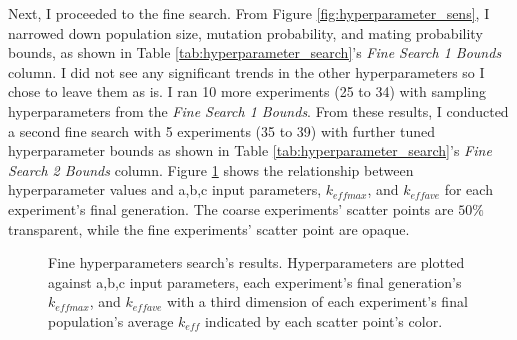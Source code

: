Next, I proceeded to the fine search. 
From Figure \ref{fig:hyperparameter_sens}, I narrowed down population size, 
mutation probability, and mating probability bounds, as shown in Table 
\ref{tab:hyperparameter_search}'s \textit{Fine Search 1 Bounds} column. 
I did not see any significant trends in the other hyperparameters so I chose 
to leave them as is. 
I ran 10 more experiments (25 to 34) with sampling hyperparameters from 
the \textit{Fine Search 1 Bounds}. 
From these results, I conducted a second fine search with 5 experiments 
(35 to 39) with further tuned hyperparameter bounds as shown in Table 
\ref{tab:hyperparameter_search}'s \textit{Fine Search 2 Bounds} column. 
Figure \ref{fig:input_hyperparameters_sens} shows the relationship between 
hyperparameter values and a,b,c input parameters, $k_{eff max}$, and 
$k_{eff ave}$ for each experiment's final generation. 
The coarse experiments' scatter points are $50\%$ transparent, while the fine 
experiments' scatter point are opaque. 
\begin{figure}[]
    \centering
    \caption{Fine hyperparameters search's results. Hyperparameters are plotted 
    against a,b,c input parameters, each experiment's final generation's 
    $k_{eff max}$, and $k_{eff ave}$ with a third dimension of each experiment's 
    final population's average $k_{eff}$ indicated by each scatter point's color.}
    \label{fig:input_hyperparameters_sens}
\end{figure}

